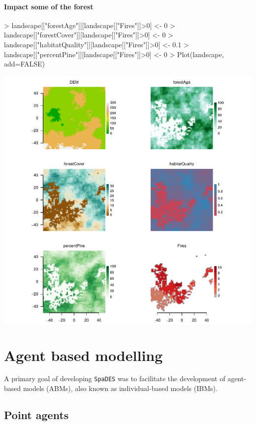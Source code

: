 \documentclass{article}
\begin{document}
\paragraph{Impact some of the forest}
\begin{Schunk}
\begin{Sinput}
> landscape[["forestAge"]][landscape[["Fires"]]>0] <- 0
> landscape[["forestCover"]][landscape[["Fires"]]>0] <- 0
> landscape[["habitatQuality"]][landscape[["Fires"]]>0] <- 0.1
> landscape[["percentPine"]][landscape[["Fires"]]>0] <- 0
> Plot(landscape, add=FALSE)
\end{Sinput}
\end{Schunk}
\includegraphics{introduction-fire-impacts-maps}

\newpage

\section{Agent based modelling}
A primary goal of developing \texttt{SpaDES} was to facilitate the development of agent-based models (ABMs), also known as individual-based models (IBMs).

\subsection{Point agents}
\end{document}
